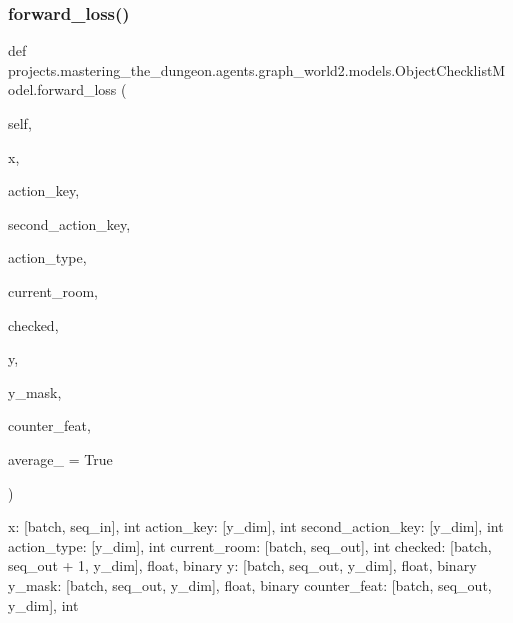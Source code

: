 \subsubsection{\texorpdfstring{forward\+\_\+loss()}{forward\_loss()}}
{\footnotesize\ttfamily def projects.\+mastering\+\_\+the\+\_\+dungeon.\+agents.\+graph\+\_\+world2.\+models.\+Object\+Checklist\+Model.\+forward\+\_\+loss (\begin{DoxyParamCaption}\item[{}]{self,  }\item[{}]{x,  }\item[{}]{action\+\_\+key,  }\item[{}]{second\+\_\+action\+\_\+key,  }\item[{}]{action\+\_\+type,  }\item[{}]{current\+\_\+room,  }\item[{}]{checked,  }\item[{}]{y,  }\item[{}]{y\+\_\+mask,  }\item[{}]{counter\+\_\+feat,  }\item[{}]{average\+\_\+ = {\ttfamily True} }\end{DoxyParamCaption})}

\begin{DoxyVerb}x: [batch, seq_in], int
action_key: [y_dim], int
second_action_key: [y_dim], int
action_type: [y_dim], int
current_room: [batch, seq_out], int
checked: [batch, seq_out + 1, y_dim], float, binary
y: [batch, seq_out, y_dim], float, binary
y_mask: [batch, seq_out, y_dim], float, binary
counter_feat: [batch, seq_out, y_dim], int
\end{DoxyVerb}
 \mbox{\label{classprojects_1_1mastering__the__dungeon_1_1agents_1_1graph__world2_1_1models_1_1ObjectChecklistModel_a14b0d48d232b33aa16052049a8bc7c1c}} 
